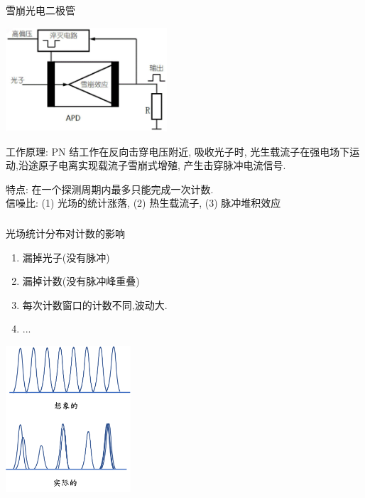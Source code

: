 \begin{frame}
 \frametitle{}
    {\Bullet} 雪崩光电二极管\\  {\vspace*{0.6em}}
      \begin{center}
           \includegraphics[width=0.45\textwidth]{figs/2022-05-04-18-25-01.png}
      \end{center}

    工作原理: PN 结工作在反向击穿电压附近, 吸收光子时, 光生载流子在强电场下运动,沿途原子电离实现载流子雪崩式增殖, 产生击穿脉冲电流信号.  \\  {\vspace*{0.6em}}

    特点: 在一个探测周期内最多只能完成一次计数. \\ 
    信噪比: (1) 光场的统计涨落, (2) 热生载流子, (3) 脉冲堆积效应 
\end{frame}

\begin{frame}
 \frametitle{}
 {\Bullet} 光场统计分布对计数的影响\\ 
 \begin{enumerate}
     \item 漏掉光子(没有脉冲)
     \item 漏掉计数(没有脉冲峰重叠)
     \item 每次计数窗口的计数不同,波动大.
     \item ...
 \end{enumerate} 
 \begin{center}
      \includegraphics[width=0.35\textwidth]{figs/17.png}
 \end{center} 
\end{frame}

